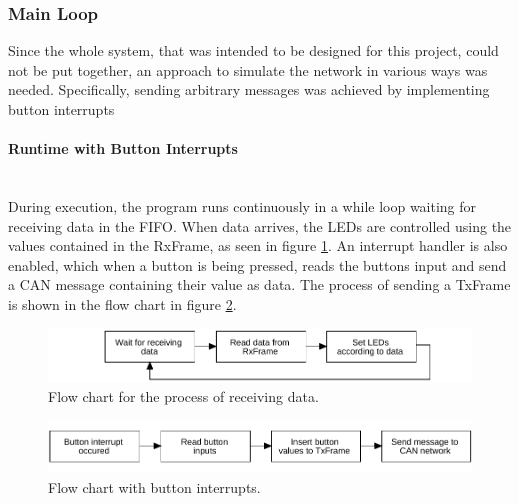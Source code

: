 \subsubsection*{Main Loop}
Since the whole system, that was intended to be designed for this project, could not be put together, an approach to simulate the network in various ways was needed.
Specifically, sending arbitrary messages was achieved by implementing button interrupts

\paragraph*{Runtime with Button Interrupts}~\\
During execution, the program runs continuously in a while loop waiting for receiving data in the FIFO.
When data arrives, the LEDs are controlled using the values contained in the RxFrame, as seen in figure \ref{fig:FlowChart_CANSoft_RecvData}.
An interrupt handler is also enabled, which when a button is being pressed, reads the buttons input and send a CAN message containing their value as data. The process of sending a TxFrame is shown in the flow chart in figure \ref{fig:FlowChart_CANSoft_BtnsIntr}.

\begin{figure}[h!]
	\centering
	\includegraphics[width = 1\linewidth]{graphics/FlowChart_CANSoft_RecvData.pdf}
	\caption{Flow chart for the process of receiving data.}
	\label{fig:FlowChart_CANSoft_RecvData}
\end{figure}


\begin{figure}[h!]
	\centering
	\includegraphics[width = 1\linewidth]{graphics/FlowChart_CANSoft_BtnsIntr.pdf}
	\caption{Flow chart with button interrupts.}
	\label{fig:FlowChart_CANSoft_BtnsIntr}
\end{figure}

